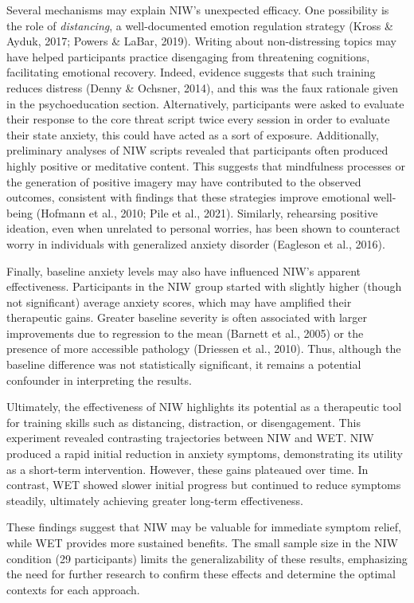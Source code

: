 \documentclass[
  man,floatsintext]{apa7}
\begin{document}
Several mechanisms may explain NIW's unexpected efficacy.
One possibility is the role of \emph{distancing}, a well-documented emotion regulation strategy (Kross \& Ayduk, 2017; Powers \& LaBar, 2019).
Writing about non-distressing topics may have helped participants practice disengaging from threatening cognitions, facilitating emotional recovery.
Indeed, evidence suggests that such training reduces distress (Denny \& Ochsner, 2014), and this was the faux rationale given in the psychoeducation section.
Alternatively, participants were asked to evaluate their response to the core threat script twice every session in order to evaluate their state anxiety, this could have acted as a sort of exposure.
Additionally, preliminary analyses of NIW scripts revealed that participants often produced highly positive or meditative content.
This suggests that mindfulness processes or the generation of positive imagery may have contributed to the observed outcomes, consistent with findings that these strategies improve emotional well-being (Hofmann et al., 2010; Pile et al., 2021).
Similarly, rehearsing positive ideation, even when unrelated to personal worries, has been shown to counteract worry in individuals with generalized anxiety disorder (Eagleson et al., 2016).

Finally, baseline anxiety levels may also have influenced NIW's apparent effectiveness.
Participants in the NIW group started with slightly higher (though not significant) average anxiety scores, which may have amplified their therapeutic gains.
Greater baseline severity is often associated with larger improvements due to regression to the mean (Barnett et al., 2005) or the presence of more accessible pathology (Driessen et al., 2010).
Thus, although the baseline difference was not statistically significant, it remains a potential confounder in interpreting the results.

Ultimately, the effectiveness of NIW highlights its potential as a therapeutic tool for training skills such as distancing, distraction, or disengagement.
This experiment revealed contrasting trajectories between NIW and WET.
NIW produced a rapid initial reduction in anxiety symptoms, demonstrating its utility as a short-term intervention.
However, these gains plateaued over time.
In contrast, WET showed slower initial progress but continued to reduce symptoms steadily, ultimately achieving greater long-term effectiveness.

These findings suggest that NIW may be valuable for immediate symptom relief, while WET provides more sustained benefits.
The small sample size in the NIW condition (29 participants) limits the generalizability of these results, emphasizing the need for further research to confirm these effects and determine the optimal contexts for each approach.
\end{document}
